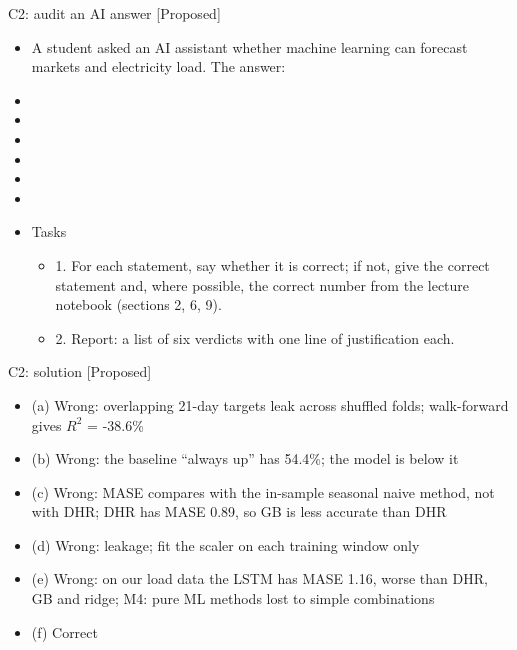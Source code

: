 \begin{frame}{C2: audit an AI answer [Proposed]}
\itemsize{\scriptsize}
\begin{itemize}
    \item A student asked an AI assistant whether machine learning can forecast markets and electricity load. The answer:
    \item {}
    \item {}
    \item {}
    \item {}
    \item {}
    \item {}
    \item Tasks
    \begin{itemize}
        \item 1. For each statement, say whether it is correct; if not, give the correct statement and, where possible, the correct number from the lecture notebook (sections 2, 6, 9).
        \item 2. Report: a list of six verdicts with one line of justification each.
    \end{itemize}
\end{itemize}
\end{frame}

\ifsolutions
\begin{frame}{C2: solution [Proposed]}
\itemsize{\scriptsize}
\begin{itemize}
    \item (a) Wrong: overlapping 21-day targets leak across shuffled folds; walk-forward gives $R^2$ = -38.6\%
    \item (b) Wrong: the baseline ``always up'' has 54.4\%; the model is below it
    \item (c) Wrong: MASE compares with the in-sample seasonal naive method, not with DHR; DHR has MASE 0.89, so GB is less accurate than DHR
    \item (d) Wrong: leakage; fit the scaler on each training window only
    \item (e) Wrong: on our load data the LSTM has MASE 1.16, worse than DHR, GB and ridge; M4: pure ML methods lost to simple combinations
    \item (f) Correct
\end{itemize}
\end{frame}
\fi



